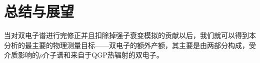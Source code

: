 

\setcounter{section}{0}

\setcounter{figure}{0}
\setcounter{table}{0}
\setcounter{equation}{0}

\chapter{总结与展望}

当对双电子谱进行完修正并且扣除掉强子衰变模拟的贡献以后，我们就可以得到本分析的最主要的物理测量目标——双电子的额外产额，其主要是由两部分构成，受介质影响的$\rho$介子谱和来自于QGP热辐射的双电子。


